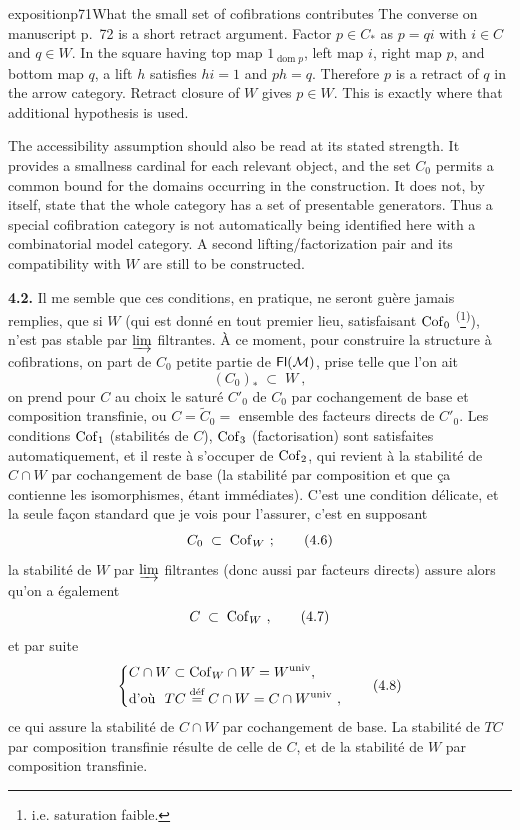 \begin{dcomment}{exposition}{p71}{What the small set of cofibrations contributes}
The converse on manuscript p.~72 is a short retract argument. Factor $p\in C_*$ as $p=q i$ with $i\in C$ and $q\in W$. In the square having top map $1_{\operatorname{dom}p}$, left map $i$, right map $p$, and bottom map $q$, a lift $h$ satisfies $hi=1$ and $ph=q$. Therefore $p$ is a retract of $q$ in the arrow category. Retract closure of $W$ gives $p\in W$. This is exactly where that additional hypothesis is used.

The accessibility assumption should also be read at its stated strength. It provides a smallness cardinal for each relevant object, and the set $C_0$ permits a common bound for the domains occurring in the construction. It does not, by itself, state that the whole category has a set of presentable generators. Thus a special cofibration category is not automatically being identified here with a combinatorial model category. A second lifting/factorization pair and its compatibility with $W$ are still to be constructed.
\end{dcomment}


\textbf{4.2.} Il me semble que ces conditions, en pratique, ne seront guère jamais remplies, que si $W$ (qui est donné en tout premier lieu, satisfaisant $\mathrm{Cof}_0$ \textsuperscript{(}\footnote[18]{i.e. saturation faible.}\textsuperscript{)}), n'est pas stable par $\varinjlim$
filtrantes. À ce moment, pour construire la structure à cofibrations, on part de $C_0$ petite partie de $\mathsf{Fl}(\mathcal{M})$, prise telle que l'on ait
\[
(C_0)_* \;\subset\; W\ , \tag*{(4.5)}
\]
on prend pour $C$ au choix le saturé $C'_0$ de $C_0$ par cochangement de base et composition transfinie, ou $C = \tilde{C}_0 =$ ensemble des facteurs directs de $C'_0$. Les conditions $\mathrm{Cof}_1$ (stabilités de $C$), $\mathrm{Cof}_3$ (factorisation) sont satisfaites automatiquement, et il reste à s'occuper de $\mathrm{Cof}_2$, qui revient à la stabilité de $C{\cap}W$ par cochangement de base (la stabilité par composition et que ça contienne les isomorphismes, étant immédiates). C'est une condition délicate, et la seule façon standard que je vois pour l'assurer, c'est en supposant
\[
C_0 \;\subset\; \Cof_W\ ; \tag*{(4.6)}
\]
la stabilité de $W$ par $\varinjlim$ filtrantes (donc aussi par facteurs directs) assure alors qu'on a également
\[
C \;\subset\; \Cof_W\ , \tag*{(4.7)}
\]
et par suite
\[
\left\{
\begin{aligned}
& C \cap W \subset \Cof_W \cap W = W^{\mathrm{univ}}, \\
& \text{d'où }\ TC \defeq C \cap W = C \cap W^{\mathrm{univ}}\ ,
\end{aligned}
\right. \tag*{(4.8)}
\]
ce qui assure la stabilité de $C \cap W$ par cochangement de base. La stabilité de $TC$ par composition transfinie résulte de celle de $C$, et de la stabilité de $W$ par composition transfinie.

